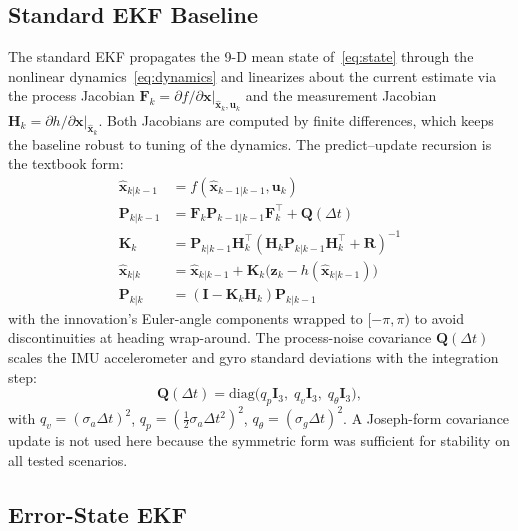 \documentclass[conference]{IEEEtran}
\begin{document}
\subsection{Standard EKF Baseline}

The standard EKF propagates the 9-D mean state of~\eqref{eq:state} through the nonlinear dynamics~\eqref{eq:dynamics} and linearizes about the current estimate via the process Jacobian $\mathbf{F}_k = \left.\partial f/\partial \mathbf{x}\right|_{\hat{\mathbf{x}}_k,\mathbf{u}_k}$ and the measurement Jacobian $\mathbf{H}_k = \left.\partial h/\partial \mathbf{x}\right|_{\hat{\mathbf{x}}_k}$. Both Jacobians are computed by finite differences, which keeps the baseline robust to tuning of the dynamics. The predict--update recursion is the textbook form:
\begin{align}
  \hat{\mathbf{x}}_{k|k-1} &= f(\hat{\mathbf{x}}_{k-1|k-1}, \mathbf{u}_k) \\
  \mathbf{P}_{k|k-1} &= \mathbf{F}_k \mathbf{P}_{k-1|k-1} \mathbf{F}_k^\top + \mathbf{Q}(\Delta t) \\
  \mathbf{K}_k &= \mathbf{P}_{k|k-1} \mathbf{H}_k^\top (\mathbf{H}_k \mathbf{P}_{k|k-1} \mathbf{H}_k^\top + \mathbf{R})^{-1} \\
  \hat{\mathbf{x}}_{k|k} &= \hat{\mathbf{x}}_{k|k-1} + \mathbf{K}_k \bigl(\mathbf{z}_k - h(\hat{\mathbf{x}}_{k|k-1})\bigr) \\
  \mathbf{P}_{k|k} &= (\mathbf{I} - \mathbf{K}_k \mathbf{H}_k) \mathbf{P}_{k|k-1}
\end{align}
with the innovation's Euler-angle components wrapped to $[-\pi, \pi)$ to avoid discontinuities at heading wrap-around. The process-noise covariance $\mathbf{Q}(\Delta t)$ scales the IMU accelerometer and gyro standard deviations with the integration step:
\begin{equation}
  \mathbf{Q}(\Delta t) = \mathrm{diag}\bigl(q_p \mathbf{I}_3,\; q_v \mathbf{I}_3,\; q_\theta \mathbf{I}_3\bigr),
\end{equation}
with $q_v = (\sigma_a \Delta t)^2$, $q_p = (\tfrac{1}{2}\sigma_a \Delta t^2)^2$, $q_\theta = (\sigma_g \Delta t)^2$. A Joseph-form covariance update is not used here because the symmetric form was sufficient for stability on all tested scenarios.

\subsection{Error-State EKF}
\end{document}
